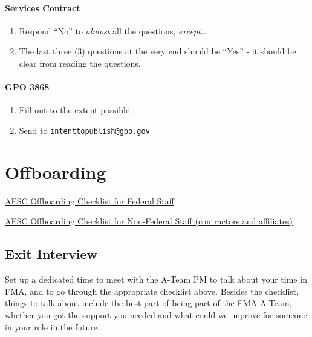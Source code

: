 \documentclass[
  letterpaper,
  DIV=11,
  numbers=noendperiod]{scrreprt}
\providecommand{\tightlist}{%
  \setlength{\itemsep}{0pt}\setlength{\parskip}{0pt}}\usepackage{longtable,booktabs,array}
\begin{document}
\subsubsection{Services Contract}\label{services-contract}

\begin{enumerate}
\def\labelenumi{\arabic{enumi}.}
\tightlist
\item
  Respond ``No'' to \emph{almost} all the questions,
  \emph{except}\ldots{}
\item
  The last three (3) questions at the very end should be ``Yes'' - it
  should be clear from reading the questions.
\end{enumerate}

\subsubsection{GPO 3868}\label{gpo-3868}

\begin{enumerate}
\def\labelenumi{\arabic{enumi}.}
\tightlist
\item
  Fill out to the extent possible.\\
\item
  Send to \texttt{intenttopublish@gpo.gov}
\end{enumerate}


\chapter{Offboarding}\label{offboarding}

\href{https://drive.google.com/file/d/17hBFFWaAImoVNqHfPJmoAKqGqs8rD1Q2/view?usp=sharing}{AFSC
Offboarding Checklist for Federal Staff}

\href{https://drive.google.com/file/d/1BdNN2rvgwdyUAuk_9cOlRGw5_ik6K37Q/view?usp=sharing}{AFSC
Offboarding Checklist for Non-Federal Staff (contractors and
affiliates)}

\section{Exit Interview}\label{exit-interview}

Set up a dedicated time to meet with the A-Team PM to talk about your
time in FMA, and to go through the appropriate checklist above. Besides
the checklist, things to talk about include the best part of being part
of the FMA A-Team, whether you got the support you needed and what could
we improve for someone in your role in the future.
\end{document}
